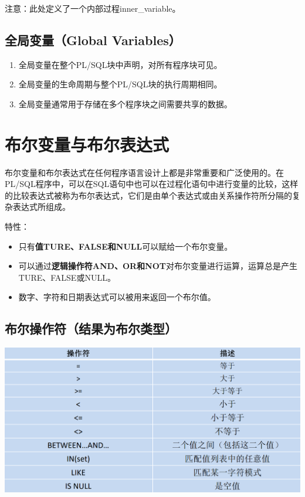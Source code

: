 \documentclass[11pt, a4paper, oneside, UTF8]{ctexbook}
\let\kaishu\relax %
\begin{document}
注意：此处定义了一个内部过程inner\_variable。

\subsection{全局变量（Global Variables）}
\begin{enumerate}
  \item 全局变量在整个PL/SQL块中声明，对所有程序块可见。
  \item 全局变量的生命周期与整个PL/SQL块的执行周期相同。
  \item 全局变量通常用于存储在多个程序块之间需要共享的数据。
\end{enumerate}

\section{布尔变量与布尔表达式}
布尔变量和布尔表达式在任何程序语言设计上都是非常重要和广泛使用的。在PL/SQL程序中，可以在SQL语句中也可以在过程化语句中进行变量的比较，这样的比较表达式被称为布尔表达式，它们是由单个表达式或由关系操作符所分隔的复杂表达式所组成。

特性：
\begin{itemize}
  \item 只有{\bfseries\kaishu 值TURE、FALSE和NULL}可以赋给一个布尔变量。
  \item 可以通过{\bfseries\kaishu 逻辑操作符AND、OR和NOT}对布尔变量进行运算，运算总是产生TURE、FALSE或NULL。
  \item 数字、字符和日期表达式可以被用来返回一个布尔值。
\end{itemize}
\subsection{布尔操作符（结果为布尔类型）}
\begin{center}
  \begin{minipage}{\textwidth}
    \center
    \includegraphics[width=\textwidth]{picture/布尔操作符.png}
    \captionsetup{hypcap=false}
    \label{fig:布尔操作符}
  \end{minipage}
\end{center}
\end{document}
